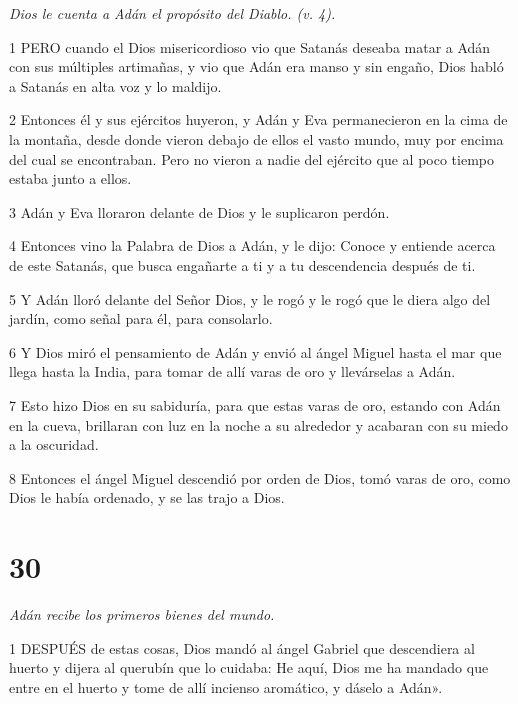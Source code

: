 \par \textit{Dios le cuenta a Adán el propósito del Diablo. (v. 4).}

\par 1 PERO cuando el Dios misericordioso vio que Satanás deseaba matar a Adán con sus múltiples artimañas, y vio que Adán era manso y sin engaño, Dios habló a Satanás en alta voz y lo maldijo.

\par 2 Entonces él y sus ejércitos huyeron, y Adán y Eva permanecieron en la cima de la montaña, desde donde vieron debajo de ellos el vasto mundo, muy por encima del cual se encontraban. Pero no vieron a nadie del ejército que al poco tiempo estaba junto a ellos.

\par 3 Adán y Eva lloraron delante de Dios y le suplicaron perdón.

\par 4 Entonces vino la Palabra de Dios a Adán, y le dijo: Conoce y entiende acerca de este Satanás, que busca engañarte a ti y a tu descendencia después de ti.

\par 5 Y Adán lloró delante del Señor Dios, y le rogó y le rogó que le diera algo del jardín, como señal para él, para consolarlo.

\par 6 Y Dios miró el pensamiento de Adán y envió al ángel Miguel hasta el mar que llega hasta la India, para tomar de allí varas de oro y llevárselas a Adán.

\par 7 Esto hizo Dios en su sabiduría, para que estas varas de oro, estando con Adán en la cueva, brillaran con luz en la noche a su alrededor y acabaran con su miedo a la oscuridad.

\par 8 Entonces el ángel Miguel descendió por orden de Dios, tomó varas de oro, como Dios le había ordenado, y se las trajo a Dios.

\chapter{30}

\par \textit{Adán recibe los primeros bienes del mundo.}

\par 1 DESPUÉS de estas cosas, Dios mandó al ángel Gabriel que descendiera al huerto y dijera al querubín que lo cuidaba: He aquí, Dios me ha mandado que entre en el huerto y tome de allí incienso aromático, y dáselo a Adán».

